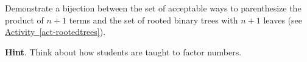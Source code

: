 \documentclass{book}
\begin{document}
\setcounter{cpjt}{180}
\addtocounter{cpjt}{-1}
\begin{activity}\label{activity-173}
\hypertarget{p-1017}{}%
Demonstrate a bijection between the set of acceptable ways to parenthesize the product of \(n+1\) terms and the set of rooted binary trees with \(n+1\) leaves (see \hyperref[act-rootedtrees]{Activity~\ref{act-rootedtrees}}).%
\par\smallskip%
\noindent\textbf{Hint}.\hypertarget{hint-120}{}\quad%
\hypertarget{p-1018}{}%
Think about how students are taught to factor numbers.%
\end{activity}

\clearpage
\end{document}
